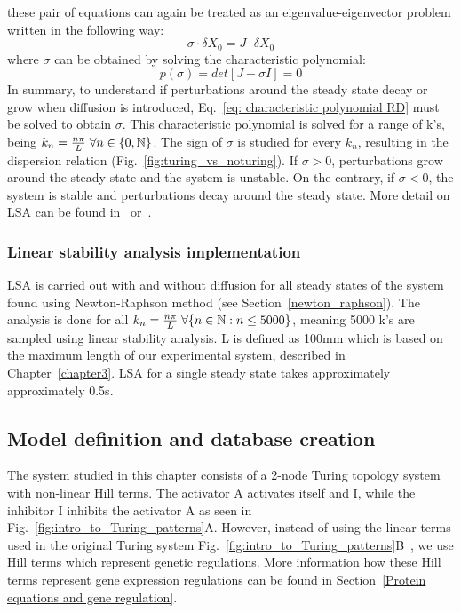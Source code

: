 these pair of equations can again be treated as an eigenvalue-eigenvector problem written in the following way:
\begin{equation}
    \sigma \cdot\delta X_{0} = J \cdot\delta X_{0}
    \label{eq: jacobian RD}
\end{equation}
where $\sigma$ can be obtained by solving the characteristic polynomial:
\begin{equation}
    p(\sigma) = det[J-\sigma I] = 0
    \label{eq: characteristic polynomial RD}
\end{equation}
In summary, to understand if perturbations around the steady state decay or grow when diffusion is introduced, Eq.~\ref{eq: characteristic polynomial RD} must be solved to obtain $\sigma$.
This characteristic polynomial is solved for a range of k's, being $k_{n}=\frac{n\pi}{L} \hspace{0.1cm}\forall n \in \{0, \mathbb{N}\} $.
The sign of $\sigma$ is studied for every $k_{n}$, resulting in the dispersion relation (Fig.~\ref{fig:turing_vs_noturing}).
If $\sigma > 0$, perturbations grow around the steady state and the system is unstable.
On the contrary, if  $\sigma < 0$, the system is stable and perturbations decay around the steady state.
More detail on LSA can be found in~\cite{J.DMurray2002} or~\cite{Glendinning1994}.

\subsubsection{Linear stability analysis implementation}
LSA is carried out with and without diffusion for all steady states of the system found using Newton-Raphson method (see Section~\ref{newton_raphson}).
The analysis is done for all $k_{n}=\frac{n\pi}{L} \hspace{0.1cm}\forall \{n \in \mathbb{N} : n \leq 5000\} $, meaning 5000 k's are sampled using linear stability analysis.
L is defined as 100mm which is based on the maximum length of our experimental system, described in Chapter~\ref{chapter3}.
LSA for a single steady state takes approximately approximately 0.5s.

\subsection{Model definition and database creation}
The system studied in this chapter consists of a 2-node Turing topology system with non-linear Hill terms.
The activator A activates itself and I, while the inhibitor I inhibits the activator A as seen in Fig.~\ref{fig:intro_to_Turing_patterns}A.
However, instead of using the linear terms used in the original Turing system Fig.~\ref{fig:intro_to_Turing_patterns}B~\parencite{Turing1952}, we use Hill terms which represent genetic regulations.
More information how these Hill terms represent gene expression regulations can be found in Section~\ref{Protein equations and gene regulation}.

